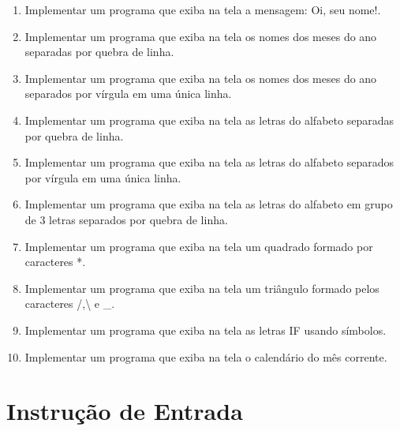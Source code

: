 \documentclass[11pt]{article}
\begin{document}
\begin{enumerate}

\item Implementar um programa que exiba na tela a mensagem: Oi, seu nome!.

\item Implementar um programa que exiba na tela os nomes dos meses do ano separadas por quebra
de linha.

\item Implementar um programa que exiba na tela os nomes dos meses do ano separados por vírgula
em uma única linha.

\item  Implementar um programa que exiba na tela as letras do alfabeto separadas por quebra de linha.

\item Implementar um programa que exiba na tela as letras do alfabeto separados por vírgula em uma
única linha.

\item  Implementar um programa que exiba na tela as letras do alfabeto em grupo de 3 letras separados
por quebra de linha.

\item Implementar um programa que exiba na tela um quadrado formado por caracteres *.

\item Implementar um programa que exiba na tela um triângulo formado pelos caracteres /,\textbackslash
e \_.

\item  Implementar um programa que exiba na tela as letras IF usando símbolos.

\item  Implementar um programa que exiba na tela o calendário do mês corrente.

\end{enumerate}

\newpage

\section{Instrução de Entrada}
\end{document}
